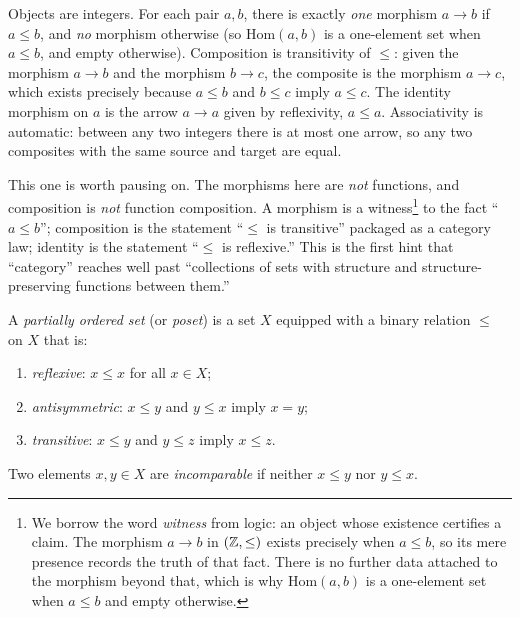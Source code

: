 \begin{example}
Objects are integers. For each pair $a, b$, there is exactly \textit{one}
morphism $a \to b$ if $a \leq b$, and \textit{no} morphism otherwise (so
$\mathrm{Hom}(a,b)$ is a one-element set when $a \leq b$, and empty otherwise).
Composition is transitivity of $\leq$: given the morphism $a \to b$ and the
morphism $b \to c$, the composite is the morphism $a \to c$, which exists
precisely because $a \leq b$ and $b \leq c$ imply $a \leq c$. The identity
morphism on $a$ is the arrow $a \to a$ given by reflexivity, $a \leq a$.
Associativity is automatic: between any two integers there is at most one arrow,
so any two composites with the same source and target are equal.

This one is worth pausing on. The morphisms here are \textit{not} functions,
and composition is \textit{not} function composition. A morphism is a witness\footnote{We
borrow the word \textit{witness} from logic: an object whose existence
certifies a claim. The morphism $a \to b$ in $({\mathbb{Z}}, \leq)$ exists precisely
when $a \leq b$, so its mere presence records the truth of that fact. There
is no further data attached to the morphism beyond that, which is why
$\mathrm{Hom}(a, b)$ is a one-element set when $a \leq b$ and empty
otherwise.} to the fact ``$a \leq b$''; composition is the statement
``$\leq$ is transitive'' packaged as a category law; identity is the
statement ``$\leq$ is reflexive.''
This is the first hint that ``category'' reaches well past ``collections of sets
with structure and structure-preserving functions between them.''
\end{example}

\begin{definition}\label{def:poset}
A \textit{partially ordered set} (or
\textit{poset}) is a set $X$ equipped with a binary relation
$\leq$ on $X$ that is:
\begin{enumerate}[label=\roman*)]
    \item \textit{reflexive}: $x \leq x$ for all $x \in X$;
    \item \textit{antisymmetric}: $x \leq y$ and $y \leq x$ imply $x = y$;
    \item \textit{transitive}: $x \leq y$ and $y \leq z$ imply $x \leq z$.
\end{enumerate}
Two elements $x, y \in X$ are \textit{incomparable} if neither $x \leq y$ nor $y \leq x$.
\end{definition}

